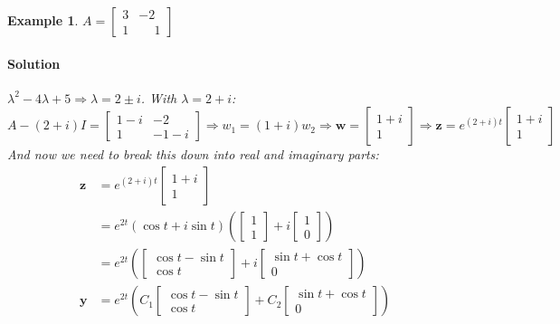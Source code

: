 \documentclass[letterpaper, 11pt, openany]{book}
\theoremstyle{mytheoremstyle}
\theoremstyle{myexamplestyle}
\newtheorem{example}{Example}[section]
\newenvironment{solution}{\paragraph{\sffamily \smaller \fontseries{b}\selectfont Solution}}{\hfill\faSquare}
\begin{document}
\begin{example}\label{e:de-comp-conj-pos-real}
    \(A = \begin{bmatrix}
        3 & -2 \\
        1 &  \phantom{-}1
    \end{bmatrix}\)
    \begin{solution}
        \(\lambda ^2-4 \lambda +5 \Rightarrow \lambda = 2 \pm i\). With \(\lambda = 2+ i\):
        \[A - (2+i)I = \begin{bmatrix}
            1-i & -2 \\
            1 & -1-i
        \end{bmatrix} \Rightarrow w_{1} = (1+i)w_{2} \Rightarrow \mathbf{w} = \begin{bmatrix}1 + i \\ 1\end{bmatrix} \Rightarrow \mathbf{z} = e^{(2 + i)t}\begin{bmatrix}1 + i \\ 1\end{bmatrix}\]
        And now we need to break this down into real and imaginary parts:
        \begin{align*}
            \mathbf{z}  &= e^{(2 + i)t}\begin{bmatrix}1 + i \\ 1\end{bmatrix}\\
                        &= e^{2t}\left(\cos t + i \sin t\right)\left(\begin{bmatrix}1 \\ 1\end{bmatrix} + i \begin{bmatrix}1 \\ 0\end{bmatrix}\right)\\
                        &= e^{2t} \left(\begin{bmatrix}\cos t - \sin t\\ \cos t\end{bmatrix} + i \begin{bmatrix}\sin t + \cos t\\ 0\end{bmatrix}\right)\\
            \mathbf{y} &= e^{2t}\left(C_{1} \begin{bmatrix}\cos t - \sin t\\ \cos t\end{bmatrix} + C_{2}\begin{bmatrix}\sin t + \cos t\\ 0\end{bmatrix}\right)

\end{align*}
\end{solution}
\end{example}
\end{document}
